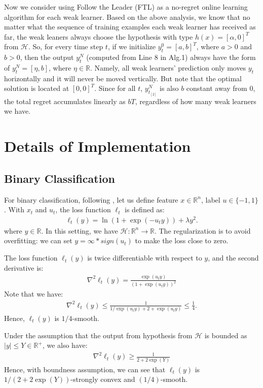 Now we consider using Follow the Leader (FTL) as a no-regret online learning algorithm for each weak learner. Based on the above analysis, we know that no matter what the sequence of training examples each weak learner has received as far, the weak leaners always choose the hypothesis with type $h(x) = [\alpha,0]^T$ from $\mathcal{H}$. So, for every time step $t$, if we initialize $y_t^0 = [a,b]^T$, where $a>0$ and $b>0$, then the output $y_t^N$ (computed from Line 8 in Alg.1) always have the form of $y_t^N = [\eta, b]$, where $\eta\in\mathbb{R}$. Namely, all weak learners' prediction only moves $y_t$ horizontally and it will never be moved vertically. But note that the optimal solution is located at $[0,0]^T$. Since for all $t$, $y_{t_{[2]}}^N$ is also $b$ constant away from $0$, the total regret accumulates linearly as $bT$, regardless of how many weak learners we have. 


\section{Details of  Implementation}
\label{sec:implementation}
\subsection{Binary Classification}
For binary classification, following \citep{friedman2001greedy}, let us define feature $x\in\mathbb{R}^n$, label $u\in\{-1,1\}$. With $x_t$ and $u_t$, the loss function $\ell_t$ is defined as:
\begin{align}
\ell_t(y) = \ln(1 + \exp(-u_t y)) + \lambda y^2.
\end{align} where $y\in\mathbb{R}$. In this setting, we have $\mathcal{H}: \mathbb{R}^n\rightarrow \mathbb{R}$. The regularization is to avoid overfitting: we can set $y = \infty*sign(u_t)$ to make the loss close to zero. 

The loss function $\ell_t(y)$ is twice differentiable with respect to $y$, and the second derivative is:
\begin{align}
\nabla^2\ell_t(y) = \frac{\exp(u_t y)}{(1+\exp(u_t y))^2}
\end{align}
Note that we have:
\begin{align}
\nabla^2\ell_t(y) \leq \frac{1}{1/\exp(u_t y) + 2 + \exp(u_t y)} \leq \frac{1}{4}.
\end{align} Hence, $\ell_t(y)$ is $1/4$-smooth.

Under the assumption that the output from hypothesis from $\mathcal{H}$ is bounded as $|y| \leq Y\in\mathbb{R}^+$, we also have:
\begin{align}
\nabla^2\ell_t(y) \geq \frac{1}{2+2\exp(Y)}
\end{align}
Hence, with boundness assumption, we can see that $\ell_t(y)$ is $1/(2+2\exp(Y))$-strongly convex and $(1/4)$-smooth. 

